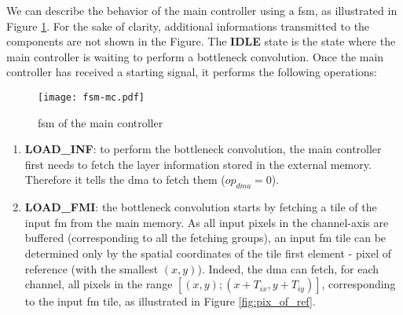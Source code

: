 We can describe the behavior of the main controller using a \acrfull{fsm}, as illustrated in Figure \ref{fig:fsm_mc}. For the sake of clarity, additional informations transmitted to the components are not shown in the Figure. The \textbf{IDLE} state is the state where the main controller is waiting to perform a bottleneck convolution. Once the main controller has received a starting signal, it performs the following operations:
%
\begin{figure}[H]
    \centering
    \texttt{[image: fsm-mc.pdf]}
    \caption{\acrshort{fsm} of the main controller}
    \label{fig:fsm_mc}
\end{figure}
%
\begin{enumerate}
    \item \textbf{LOAD\_INF}: to perform the bottleneck convolution, the main controller first needs to fetch the layer information stored in the external memory. Therefore it tells the \acrshort{dma} to fetch them ($op_{dma} = 0$).
    \item \textbf{LOAD\_FMI}: the bottleneck convolution starts by fetching a tile of the input \acrshort{fm} from the main memory. As all input pixels in the channel-axis are buffered (corresponding to all the fetching groups), an input \acrshort{fm} tile can be determined only by the spatial coordinates of the tile first element - pixel of reference (with the smallest $(x, y)$). Indeed, the \acrshort{dma} can fetch, for each channel, all pixels in the range $[(x, y); (x+T_{ix}, y+T_{iy})]$, corresponding to the input \acrshort{fm} tile, as illustrated in Figure \ref{fig:pix_of_ref}.
    

\end{enumerate}

